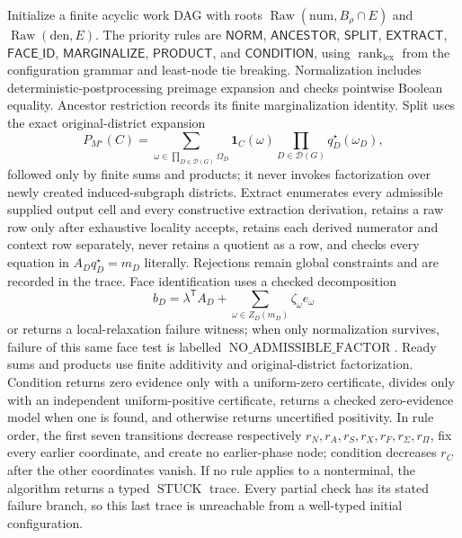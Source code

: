 Initialize a finite acyclic work DAG with roots \(\operatorname{Raw}(\mathrm{num},B_\rho\cap E)\) and \(\operatorname{Raw}(\mathrm{den},E)\).  The priority rules are \(\mathsf{NORM}\), \(\mathsf{ANCESTOR}\), \(\mathsf{SPLIT}\), \(\mathsf{EXTRACT}\), \(\mathsf{FACE\_ID}\), \(\mathsf{MARGINALIZE}\), \(\mathsf{PRODUCT}\), and \(\mathsf{CONDITION}\), using \(\operatorname{rank}_{\mathrm{lex}}\) from the configuration grammar and least-node tie breaking.  Normalization includes deterministic-postprocessing preimage expansion and checks pointwise Boolean equality.  Ancestor restriction records its finite marginalization identity.  Split uses the exact original-district expansion
\[
P_{M^\star}(C)=
\sum_{\omega\in\prod_{D\in\mathcal D(G)}\Omega_D}
\mathbf 1_C(\omega)
\prod_{D\in\mathcal D(G)}q_D^\star(\omega_D),
\]
followed only by finite sums and products; it never invokes factorization over newly created induced-subgraph districts.  Extract enumerates every admissible supplied output cell and every constructive extraction derivation, retains a raw row only after exhaustive locality accepts, retains each derived numerator and context row separately, never retains a quotient as a row, and checks every equation in \(A_Dq_D^\star=m_D\) literally.  Rejections remain global constraints and are recorded in the trace.  Face identification uses a checked decomposition
\[
b_D=\lambda^{\mathsf T}A_D+
\sum_{\omega\in Z_D(m_D)}\zeta_\omega e_\omega
\]
or returns a local-relaxation failure witness; when only normalization survives, failure of this same face test is labelled \(\operatorname{NO\_ADMISSIBLE\_FACTOR}\).  Ready sums and products use finite additivity and original-district factorization.  Condition returns zero evidence only with a uniform-zero certificate, divides only with an independent uniform-positive certificate, returns a checked zero-evidence model when one is found, and otherwise returns uncertified positivity.  In rule order, the first seven transitions decrease respectively \(r_N,r_A,r_S,r_X,r_F,r_{\Sigma},r_{\Pi}\), fix every earlier coordinate, and create no earlier-phase node; condition decreases \(r_C\) after the other coordinates vanish.  If no rule applies to a nonterminal, the algorithm returns a typed \(\operatorname{STUCK}\) trace.  Every partial check has its stated failure branch, so this last trace is unreachable from a well-typed initial configuration.
